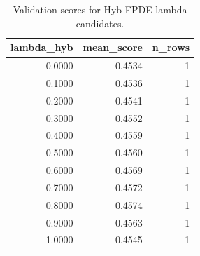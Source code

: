 \begin{table}[t]
\caption{Validation scores for Hyb-FPDE lambda candidates.}
\label{tab:lambda_distribution_computed}
\centering
\begin{tabular}{rrr}
\toprule
lambda\_hyb & mean\_score & n\_rows \\
\midrule
0.0000 & 0.4534 & 1 \\
0.1000 & 0.4536 & 1 \\
0.2000 & 0.4541 & 1 \\
0.3000 & 0.4552 & 1 \\
0.4000 & 0.4559 & 1 \\
0.5000 & 0.4560 & 1 \\
0.6000 & 0.4569 & 1 \\
0.7000 & 0.4572 & 1 \\
0.8000 & 0.4574 & 1 \\
0.9000 & 0.4563 & 1 \\
1.0000 & 0.4545 & 1 \\
\bottomrule
\end{tabular}

\end{table}
